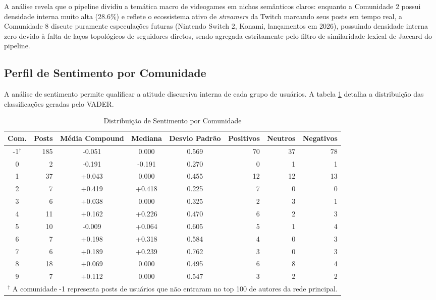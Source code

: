 \documentclass[12pt,a4paper]{article}
\begin{document}
A análise revela que o pipeline dividiu a temática macro de videogames em nichos semânticos claros: enquanto a Comunidade 2 possui densidade interna muito alta (28.6\%) e reflete o ecossistema ativo de \textit{streamers} da Twitch marcando seus posts em tempo real, a Comunidade 8 discute puramente especulações futuras (Nintendo Switch 2, Konami, lançamentos em 2026), possuindo densidade interna zero devido à falta de laços topológicos de seguidores diretos, sendo agregada estritamente pelo filtro de similaridade lexical de Jaccard do pipeline.

\subsection{Perfil de Sentimento por Comunidade}
A análise de sentimento permite qualificar a atitude discursiva interna de cada grupo de usuários. A tabela \ref{tab:sentiment} detalha a distribuição das classificações geradas pelo VADER.

\begin{table}[H]
\centering
\caption{Distribuição de Sentimento por Comunidade}
\label{tab:sentiment}
\begin{tabular}{crcccrrr}
\toprule
\textbf{Com.} & \textbf{Posts} & \textbf{Média Compound} & \textbf{Mediana} & \textbf{Desvio Padrão} & \textbf{Positivos} & \textbf{Neutros} & \textbf{Negativos} \\
\midrule
-1$^\dagger$ & 185 & -0.051 & 0.000 & 0.569 & 70 & 37 & 78 \\
0 & 2 & -0.191 & -0.191 & 0.270 & 0 & 1 & 1 \\
1 & 37 & +0.043 & 0.000 & 0.455 & 12 & 12 & 13 \\
2 & 7 & +0.419 & +0.418 & 0.225 & 7 & 0 & 0 \\
3 & 6 & +0.038 & 0.000 & 0.325 & 2 & 3 & 1 \\
4 & 11 & +0.162 & +0.226 & 0.470 & 6 & 2 & 3 \\
5 & 10 & -0.009 & +0.064 & 0.605 & 5 & 1 & 4 \\
6 & 7 & +0.198 & +0.318 & 0.584 & 4 & 0 & 3 \\
7 & 6 & +0.189 & +0.239 & 0.762 & 3 & 0 & 3 \\
8 & 18 & +0.069 & 0.000 & 0.495 & 6 & 8 & 4 \\
9 & 7 & +0.112 & 0.000 & 0.547 & 3 & 2 & 2 \\
\bottomrule
\multicolumn{8}{l}{\footnotesize $^\dagger$ A comunidade -1 representa posts de usuários que não entraram no top 100 de autores da rede principal.}
\end{tabular}
\end{table}
\end{document}
